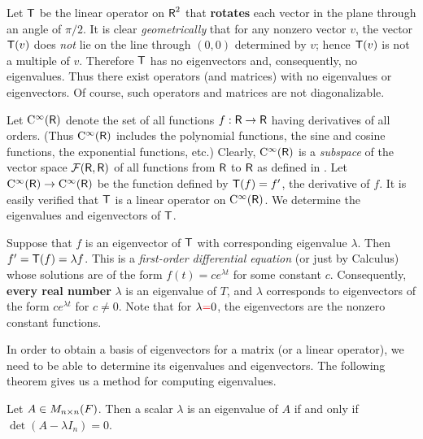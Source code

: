 \begin{example} \label{example 5.1.2}
Let \(\textsf{T}\) be the linear operator on \(\textsf{R}^2\) that \textbf{rotates} each vector in the plane through an angle of \(\pi/2\).
It is clear \emph{geometrically} that for any nonzero vector \(v\), the vector \(\textsf{T}(v)\) does \emph{not} lie on the line through \((0, 0)\) determined by \(v\);
hence \(\textsf{T}(v)\) is not a multiple of \(v\).
Therefore \(\textsf{T}\) has no eigenvectors and, consequently, no eigenvalues.
Thus there exist operators (and matrices) with no eigenvalues or eigenvectors.
Of course, such operators and matrices are not diagonalizable.
\end{example}

\begin{example} \label{example 5.1.3}
Let \(\mathrm{C}^{\infty}(\textsf{R})\) denote the set of all functions \(f: \textsf{R} \to \textsf{R}\) having derivatives of all orders.
(Thus \(\mathrm{C}^{\infty}(\textsf{R})\) includes the polynomial functions, the sine and cosine functions, the exponential functions, etc.)
Clearly, \(\mathrm{C}^{\infty}(\textsf{R})\) is a \emph{subspace} of the vector space \(\mathcal{F}(\textsf{R}, \textsf{R})\) of all functions from \(\textsf{R}\) to \(\textsf{R}\) as defined in .
Let \(\mathrm{C}^{\infty}(\textsf{R}) \to \mathrm{C}^{\infty}(\textsf{R})\) be the function defined by \(\textsf{T}(f) = f'\), the derivative of \(f\).
It is easily verified that \(\textsf{T}\) is a linear operator on \(\mathrm{C}^{\infty}(\textsf{R})\).
We determine the eigenvalues and eigenvectors of \(\textsf{T}\).

Suppose that \(f\) is an eigenvector of \(\textsf{T}\) with corresponding eigenvalue \(\lambda\).
Then \(f' = \textsf{T}(f) = \lambda f\).
This is a \emph{first-order differential equation} (or just by Calculus) whose solutions are of the form \(f(t) = c e^{\lambda t}\) for some constant \(c\).
Consequently, \textbf{every real number} \(\lambda\) is an eigenvalue of \(T\), and \(\lambda\) corresponds to eigenvectors of the form \(c e^{\lambda t}\) for \(c \ne 0\).
Note that for \(\lambda \RED{=} 0\), the eigenvectors are the nonzero constant functions.
\end{example}

In order to obtain a basis of eigenvectors for a matrix (or a linear operator), we need to be able to determine its eigenvalues and eigenvectors.
The following theorem gives us a method for computing eigenvalues.

\begin{theorem} \label{thm 5.2}
Let \(A \in M_{n \times n}(F)\).
Then a scalar \(\lambda\) is an eigenvalue of \(A\) if and only if \(\det(A - \lambda I_n) = 0\).
\end{theorem}

